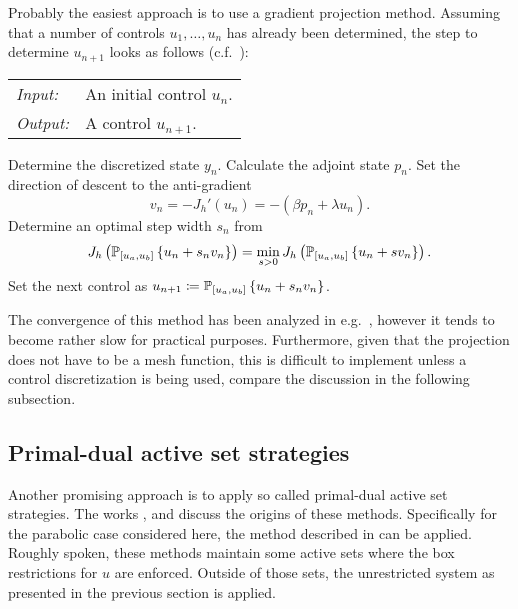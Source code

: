 \documentclass[../thesis.tex]{subfiles}
\begin{document}
Probably the easiest approach is to use a gradient projection method.
Assuming that a number of controls $u_1, \ldots, u_n$ has already been determined, the step to determine $u_{n+1}$ looks as follows (c.f.\ \cite{Troeltzsch}):
\begin{algorithmbox}
\begin{tabular}{@{}ll}
\textit{Input:} & An initial control $u_n$. \\
\textit{Output:} & A control $u_{n+1}$.
\end{tabular}
\end{algorithmbox}
\vspace{-10pt}
\begin{algorithm}
Determine the discretized state $y_n$.\;
Calculate the adjoint state $p_n$.\;
Set the direction of descent to the anti-gradient
\[
	v_n = -J_h'(u_n) = - (\beta p_n + \lambda u_n).
\]\;
\vspace{-15pt}
Determine an optimal step width $s_n$ from
\[
	J_h \left( \mathbb{P}_{[u_a, u_b]} \left\{ u_n + s_n v_n \right\} \right) = \min_{s > 0} J_h \left( \mathbb{P}_{[u_a, u_b]} \left\{ u_n + s v_n \right\} \right).
\]\;
\vspace{-15pt}
Set the next control as $u_{n+1} \coloneqq \mathbb{P}_{[u_a, u_b]} \left\{ u_n + s_n v_n \right\}$.
\end{algorithm}
\vspace{-4pt}
\EndAlgorithmLine
The convergence of this method has been analyzed in e.g.\ \cite{HinzePinnauUlbrich}, however it tends to become rather slow for practical purposes.
Furthermore, given that the projection does not have to be a mesh function, this is difficult to implement unless a control discretization is being used, compare the discussion in the following subsection.
\subsection{Primal-dual active set strategies}
\label{sec:KR-numerics}
Another promising approach is to apply so called primal-dual active set strategies. The works \cite{ItoKunisch-2000}, \cite{ItoKunisch} and \cite{BergouniouxItoKunisch} discuss the origins of these methods. Specifically for the parabolic case considered here, the method described in \cite{KunischRoesch} can be applied.
Roughly spoken, these methods maintain some active sets where the box restrictions for $u$ are enforced. Outside of those sets, the unrestricted system as presented in the previous section is applied.
\end{document}
